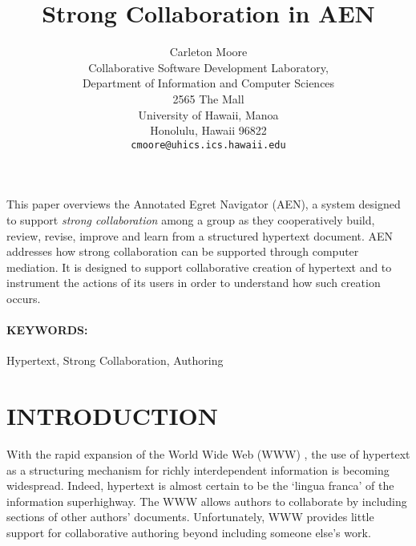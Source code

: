 



\title{Strong Collaboration in AEN}
\author{Carleton Moore\\
Collaborative Software Development Laboratory,\\
Department of Information and Computer Sciences\\
2565 The Mall\\
University of Hawaii, Manoa\\
Honolulu, Hawaii   96822\\
{\tt cmoore@uhics.ics.hawaii.edu}}
\maketitle
\abstract

This paper overviews the Annotated Egret Navigator (AEN), a system designed
to support {\em strong collaboration} among a group as they cooperatively
build, review, revise, improve and learn from a structured hypertext
document.  AEN addresses how strong collaboration can be supported through
computer mediation.  It is designed to support collaborative creation of
hypertext and to instrument the actions of its users in order to understand
how such creation occurs.

\paragraph{KEYWORDS:} Hypertext, Strong Collaboration, Authoring
\section{INTRODUCTION}
With the rapid expansion of the World Wide Web (WWW) \cite{Berners-Lee94},
the use of hypertext as a structuring mechanism for richly interdependent
information is becoming widespread.  Indeed, hypertext is almost certain to
be the `lingua franca' of the information superhighway.  The WWW allows
authors to collaborate by including sections of other authors' documents.
Unfortunately, WWW provides little support for collaborative authoring
beyond including someone else's work.

